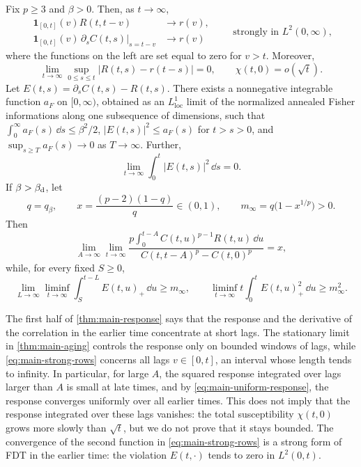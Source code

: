 \begin{theorem}\label{thm:main-response}
Fix $p\ge3$ and $\beta>0$. Then, as $t\to\infty$,
\begin{equation}
\begin{aligned}
 \mathbf1_{[0,t]}(v)R(t,t-v)&\longrightarrow r(v),\\
 \mathbf1_{[0,t]}(v)\,\partial_sC(t,s)\big|_{s=t-v}&\longrightarrow r(v)
\end{aligned}
 \qquad\text{strongly in }L^2(0,\infty),
 \label{eq:main-strong-rows}
\end{equation}
where the functions on the left are set equal to zero for $v>t$. Moreover,
\begin{equation}
 \lim_{t\to\infty}\sup_{0\le s\le t}|R(t,s)-r(t-s)|=0,
 \qquad \chi(t,0)=o(\sqrt t).
 \label{eq:main-uniform-response}
\end{equation}
Let $E(t,s)=\partial_sC(t,s)-R(t,s)$. There exists a nonnegative integrable function $a_F$ on $[0,\infty)$, obtained as an $L^1_{\mathrm{loc}}$ limit of the normalized annealed Fisher informations along one subsequence of dimensions, such that $\int_0^\infty a_F(s)\,\dd s\le\beta^2/2$, $|E(t,s)|^2\le a_F(s)$ for $t>s>0$, and $\sup_{s\ge T}a_F(s)\to0$ as $T\to\infty$. Further,
\begin{equation}
 \lim_{t\to\infty}\int_0^t|E(t,s)|^2\,\dd s=0.
 \label{eq:main-defect-l2}
\end{equation}
If $\beta>\beta_{\mathrm d}$, let
\[
 q=q_\beta,\qquad x=\frac{(p-2)(1-q)}q\in(0,1),\qquad
 m_\infty=q\bigl(1-x^{1/p}\bigr)>0.
\]
Then
\begin{equation}
 \lim_{A\to\infty}\lim_{t\to\infty}
 \frac{p\int_0^{t-A}C(t,u)^{p-1}R(t,u)\,\dd u}
 {C(t,t-A)^p-C(t,0)^p}=x,
 \label{eq:main-weighted-ratio}
\end{equation}
while, for every fixed $S\ge0$,
\begin{equation}
 \lim_{L\to\infty}\liminf_{t\to\infty}
 \int_S^{t-L}E(t,u)_+\,\dd u\ge m_\infty,
 \qquad
 \liminf_{t\to\infty}t\int_0^tE(t,u)_+^2\,\dd u\ge m_\infty^2.
 \label{eq:main-defect-budget}
\end{equation}
\end{theorem}

The first half of \cref{thm:main-response} says that the response and the derivative of the correlation in the earlier time concentrate at short lags. The stationary limit in \cref{thm:main-aging} controls the response only on bounded windows of lags, while \eqref{eq:main-strong-rows} concerns all lags $v\in[0,t]$, an interval whose length tends to infinity. In particular, for large $A$, the squared response integrated over lags larger than $A$ is small at late times, and by \eqref{eq:main-uniform-response}, the response converges uniformly over all earlier times. This does not imply that the response integrated over these lags vanishes: the total susceptibility $\chi(t,0)$ grows more slowly than $\sqrt t$, but we do not prove that it stays bounded. The convergence of the second function in \eqref{eq:main-strong-rows} is a strong form of FDT in the earlier time: the violation $E(t,\cdot)$ tends to zero in $L^2(0,t)$.

